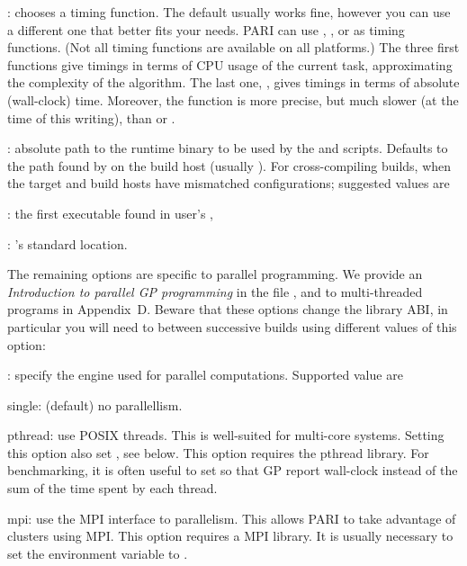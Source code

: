: chooses a timing function. The default usually
works fine, however you can use a different one that better fits your needs.
PARI can use , ,  or
 as timing functions. (Not all timing functions are available on
all platforms.) The three first functions give timings in terms of CPU usage
of the current task, approximating the complexity of the algorithm. The last
one, , gives timings in terms of absolute (wall-clock) time.
Moreover, the  function is more precise, but much slower
(at the time of this writing), than  or .

: absolute path to the runtime 
binary to be used by the  and  scripts. Defaults
to the path found by  on the build host (usually
). For cross-compiling builds, when the target and build
hosts have mismatched configurations; suggested values are

: the first  executable found in user's
,

: 's standard location.

The remaining options are specific to parallel programming. We provide an
\emph{Introduction to parallel GP programming} in the file
, and to multi-threaded  programs
in Appendix~D. Beware that these options change the library ABI, in
particular you will need to  between successive builds
using different values of this option:

: specify the engine used for parallel computations.
Supported value are

\item single: (default) no parallellism.

\item pthread: use POSIX threads. This is well-suited for multi-core systems.
Setting this option also set , see below. This option
requires the pthread library.
For benchmarking, it is often useful to set  so that GP
report wall-clock instead of the sum of the time spent by each thread.

\item mpi: use the MPI interface to parallelism.  This allows PARI to take
advantage of clusters using MPI. This option requires a MPI library.
It is usually necessary to set the environment variable  to
.


